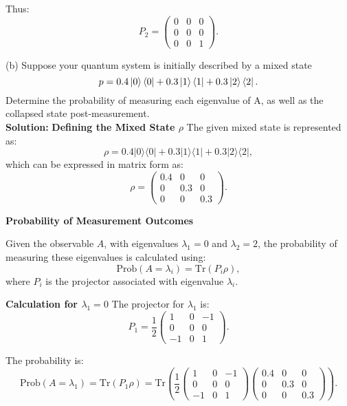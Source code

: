 \documentclass{article}
\theoremstyle{plain}
\numberwithin{thm}{section}
\theoremstyle{definition}
\begin{document}
\begin{enumerate}
    Thus:
    \[
    P_2 = \begin{pmatrix} 0 & 0 & 0 \\ 0 & 0 & 0 \\ 0 & 0 & 1 \end{pmatrix}.
    \]
    
    (b) Suppose your quantum system is initially described by a mixed state $$p = 0.4\ket{0}\bra{0}+0.3\ket{1}\bra{1}+0.3\ket{2}\bra{2}.$$ Determine the probability of measuring each eigenvalue of A, as well as the collapsed state post-measurement.\\

    \textbf{Solution:}
    \textbf{Defining the Mixed State $\rho$}  
    The given mixed state is represented as:
    \[
    \rho = 0.4|0\rangle\langle 0| + 0.3|1\rangle\langle 1| + 0.3|2\rangle\langle 2|,
    \]
    which can be expressed in matrix form as:
    \[
    \rho = 
    \begin{pmatrix}
    0.4 & 0 & 0 \\
    0 & 0.3 & 0 \\
    0 & 0 & 0.3
    \end{pmatrix}.
    \]
    
    \textbf{Probability of Measurement Outcomes}  
    
    Given the observable $A$, with eigenvalues $\lambda_1 = 0$ and $\lambda_2 = 2$, the probability of measuring these eigenvalues is calculated using:
    \[
    \text{Prob}(A = \lambda_i) = \text{Tr}(P_i \rho),
    \]
    where $P_i$ is the projector associated with eigenvalue $\lambda_i$.
    
    \textbf{Calculation for $\lambda_1 = 0$}  
    The projector for $\lambda_1$ is:
    \[
    P_1 = \frac{1}{2}
    \begin{pmatrix}
    1 & 0 & -1 \\
    0 & 0 & 0 \\
    -1 & 0 & 1
    \end{pmatrix}.
    \]
    
    The probability is:
    \[
    \text{Prob}(A = \lambda_1) = \text{Tr}(P_1 \rho) = 
    \text{Tr}\left(
    \frac{1}{2}
    \begin{pmatrix}
    1 & 0 & -1 \\
    0 & 0 & 0 \\
    -1 & 0 & 1
    \end{pmatrix}
    \begin{pmatrix}
    0.4 & 0 & 0 \\
    0 & 0.3 & 0 \\
    0 & 0 & 0.3
    \end{pmatrix}
    \right).
    \]
    

\end{enumerate}
\end{document}
